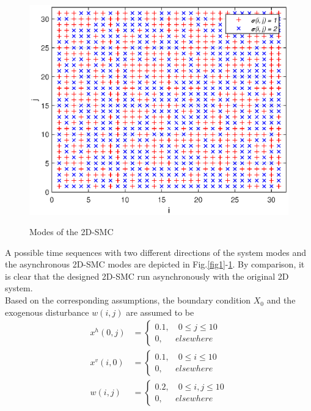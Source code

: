 \documentclass[journal,final,twocolumn]{IEEEtran}
\begin{document}
\begin{figure}[!htb]
	\centering\includegraphics[scale=0.6]{./simulations/sigma_eps.eps}\\ 
	\caption{Modes of the 2D-SMC}
	\label{fig2}
\end{figure}
A possible time sequences with two different directions of the system modes and the asynchronous 2D-SMC modes are depicted in Fig.\ref{fig1}-\ref{fig2}. By comparison, it is clear that the designed 2D-SMC run asynchronously with the original 2D system.  \\
Based on the corresponding assumptions, the boundary condition $X_{0}$ and  the exogenous disturbance $w(i,j)$ are assumed to be
\begin{equation*}
\begin{aligned}
	x^{h}(0, j)&=\begin{cases}
		0.1, \quad 0\leq j \leq 10 \\
		0, \quad \ \ elsewhere
	\end{cases} \\
	x^{v}(i, 0)&=\begin{cases}
	0.1, \quad 0\leq i \leq 10 \\
	0, \quad \ \ elsewhere
	\end{cases}\\
	w(i, j)\ &=\begin{cases}
	0.2, \quad 0\leq i,j \leq 10 \\
	0, \quad \ \ elsewhere
	\end{cases}
\end{aligned}
\end{equation*}
\end{document}
